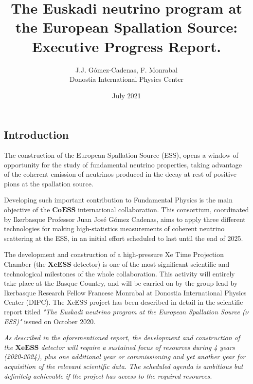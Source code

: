 \documentclass[12pt,a4paper,article]{report} %
\title{The Euskadi neutrino program at the European Spallation Source: Executive Progress Report.}
\author{J.J. Gómez-Cadenas, F. Monrabal \\ Donostia International Physics Center}
\date{July 2021} %
\begin{document}
\maketitle
\begin{centering}
\section*{Introduction}
\end{centering}
The construction of the European Spallation Source (ESS), opens a window of opportunity for the study of fundamental neutrino properties, taking advantage of the coherent emission of neutrinos produced in the decay at rest of positive pions at the spallation source. 

Developing such important contribution to Fundamental Physics is the  main objective of the $\mathbf{CoESS}$ international collaboration. This consortium, coordinated by Ikerbasque Professor Juan José Gómez Cadenas, aims to apply three different technologies for making high-statistics measurements of coherent neutrino scattering at the ESS, in an initial effort scheduled to last until the end of 2025.

The development and construction of a high-pressure Xe Time Projection Chamber (the $\mathbf{XeESS}$ detector) is one of the most significant scientific and technological milestones of the whole collaboration. This activity will entirely take place at the Basque Country, and will be carried on by the group lead by Ikerbasque Research Fellow Francesc Monrabal at Donostia International Physics Center (DIPC). The XeESS project has been described in detail in the scientific report titled \emph{"The Euskadi neutrino program at the European Spallation Source ($\nu$ESS)"} issued on October 2020. 


\begin{tcolorbox}


\emph{As described in the aforementioned report, the development and construction of the $\mathbf{XeESS}$  detector will require a sustained focus of resources during 4 years (2020-2024), plus one additional year or commissioning and yet another year for acquisition of the relevant scientific data. The scheduled agenda is ambitious but definitely achievable if the project has access to the required resources.}


\end{tcolorbox}
\end{document}
